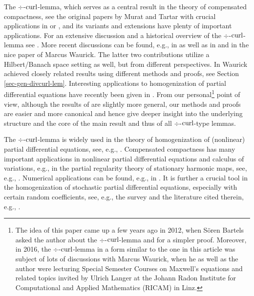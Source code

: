 \documentclass[a4paper]{amsart}
\begin{document}
The $\div$-$\operatorname{curl}$-lemma, which serves as a central result in the theory of compensated compactness,
see the original papers by Murat \cite{murat1978} and Tartar \cite{tartar1979}
with crucial applications in \cite{coifmanlionsmeyersemmescompcomphardy}
or \cite{evans1990,struwe2008},
and its variants and extensions have plenty of important applications.
For an extensive discussion and a historical overview of the $\div$-$\operatorname{curl}$-lemma see \cite{tartar2009}.
More recent discussions can be found, e.g., in \cite{brianecasadodiazmurat2009,tartar2015}
as well as in \cite{chenliglobrig}
and in the nice paper \cite{waurick2018a} of Marcus Waurick.
The latter two contributions utilize a Hilbert/Banach space setting as well,
but from different perspectives.
In \cite{waurick2018a} Waurick achieved closely related
results using different methods and proofs, see Section \ref{sec-gen-divcurl-lem}.
Interesting applications to homogenization of partial differential equations 
have recently been given in \cite{waurick2018b}.
From our personal\footnote{The idea of this paper came up a few years ago in 2012,
when S\"oren Bartels asked the author about the $\div$-$\operatorname{curl}$-lemma and for a simpler proof.
Moreover, in 2016, the $\div$-$\operatorname{curl}$-lemma in a form similar to the one in this article
was subject of lots of discussions with Marcus Waurick, when he as well as the author were lecturing
Special Semester Courses on Maxwell's equations and related topics invited by Ulrich Langer
at the Johann Radon Institute for Computational and Applied Mathematics (RICAM) in Linz.} 
point of view, although the results of \cite{chenliglobrig,waurick2018a} are slightly more general,
our methods and proofs are easier and more canonical and hence give deeper insight into the underlying structure 
and the core of the main result and thus of all $\div$-$\operatorname{curl}$-type lemmas.

The $\div$-$\operatorname{curl}$-lemma is widely used in the theory of homogenization of (nonlinear) partial differential equations,
see, e.g., \cite{struwe2008}.
Compensated compactness has many important applications 
in nonlinear partial differential equations and calculus of variations, e.g., 
in the partial regularity theory of stationary harmonic maps, see, e.g., 
\cite{freiremuellerstruwe1998,evans1991,riviere2007}.
Numerical applications can be found, e.g., in \cite{bartels2010}.
It is further a crucial tool in the homogenization of stochastic partial differential equations,
especially with certain random coefficients, see, e.g.,
the survey \cite{alexanderian2015}
and the literature cited therein, e.g., \cite{glorianeukammotto2015}. 
\end{document}
